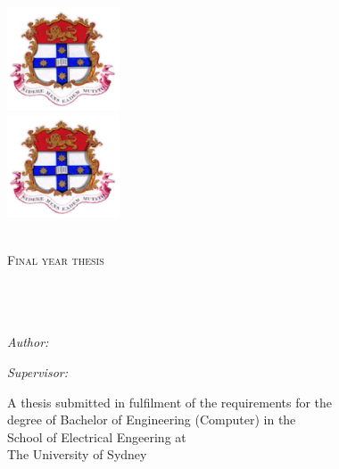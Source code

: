 \documentclass[a4paper]{report}
\title{\thesisTitle{}}
\author{\studentName{}}
\date{\thesisDate{}}
\begin{document}
\begin{titlepage}
\begin{center}

\ifpdf
    \includegraphics[width=0.25\textwidth]{sydney_uni_coat_of_arms.png}\\[1cm]
\else
    \includegraphics[width=0.25\textwidth]{sydney_uni_coat_of_arms.eps}\\[1cm]
\fi

\textsc{\LARGE \universityName{}}\\[1.5cm]

\textsc{\Large Final year thesis}\\[0.5cm]

\HRule \\[0.4cm]
{\huge \bfseries \thesisTitle{}}\\[0.4cm]
\HRule \\[1.5cm]

\begin{minipage}{0.4\textwidth}
    \begin{flushleft} \large
        \emph{Author:}\\
        \studentName{}
    \end{flushleft}
\end{minipage}
\begin{minipage}{0.4\textwidth}
    \begin{flushright} \large
        \emph{Supervisor:} \\
        \supervisorName{}
    \end{flushright}
\end{minipage}

\vfill

{\large A thesis submitted in fulfilment of the requirements for the\\
degree of Bachelor of Engineering (Computer) in the \\
School of Electrical Engeering at\\
The University of Sydney}

\vfill

{\large \thesisDate{}}

\end{center}
\end{titlepage}
\end{document}
